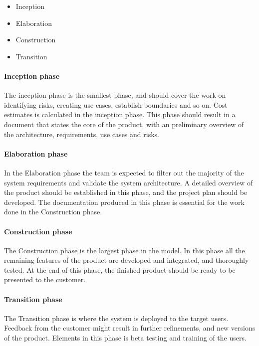 \begin{itemize}
\item{Inception}
\item{Elaboration}
\item{Construction}
\item{Transition}
\end{itemize}

\paragraph{Inception phase} The inception phase is the smallest phase, and should cover the work on identifying risks, creating use cases, establish boundaries and so on. Cost estimates is calculated in the inception phase. This phase should result in a document that states the core of the product, with an preliminary overview of the architecture, requirements, use cases and risks.

\paragraph{Elaboration phase} In the Elaboration phase the team is expected to filter out the majority of the system requirements and validate the system architecture. A detailed overview of the product should be established in this phase, and the project plan should be developed. The documentation produced in this phase is essential for the work done in the Construction phase.

\paragraph{Construction phase} The Construction phase is the largest phase in the model. In this phase all the remaining features of the product are developed and integrated, and thoroughly tested. At the end of this phase, the finished product should be ready to be presented to the customer.

\paragraph{Transition phase} The Transition phase is where the system is deployed to the target users. Feedback from the customer might result in further refinements, and new versions of the product. Elements in this phase is beta testing and training of the users.


